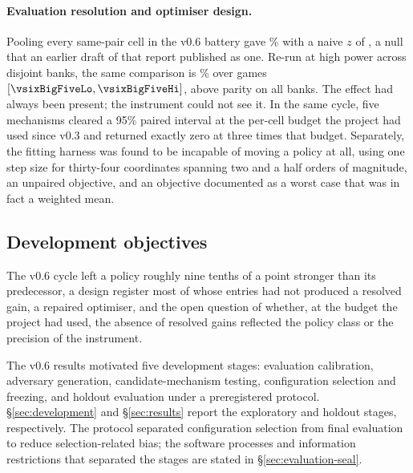 \paragraph{Evaluation resolution and optimiser design.} Pooling every same-pair cell in the v0.6 battery gave \vsixHeadPooled\% with a naive $z$ of
\vsixHeadZ{}, a null that an earlier draft of that report published as one. Re-run at high power
across \vsixBigFiveBanks{} disjoint banks, the same comparison is \vsixBigFive\% over
\vsixBigFiveN{} games $[\vsixBigFiveLo, \vsixBigFiveHi]$, above parity on all \vsixBigFiveAbove{}
banks. The effect had always been present; the instrument could not see it. In the same cycle, five
mechanisms cleared a 95\% paired interval at the per-cell budget the project had used since v0.3 and
returned exactly zero at three times that budget. Separately, the fitting harness was found to be
incapable of moving a policy at all, using one step size for thirty-four coordinates spanning two and
a half orders of magnitude, an unpaired objective, and an objective documented as a worst case that
was in fact a weighted mean.

\subsection{Development objectives}
\label{sec:background-handoff}

The v0.6 cycle left a policy roughly nine tenths of a point stronger than its predecessor, a design
register most of whose entries had not produced a resolved gain, a repaired optimiser, and the open
question of whether, at the budget the project had used, the absence of resolved gains reflected
the policy class or the precision of the instrument.

The v0.6 results motivated five development stages: evaluation calibration, adversary generation,
candidate-mechanism testing, configuration selection and freezing, and holdout evaluation under a
preregistered protocol. \S\ref{sec:development} and \S\ref{sec:results} report the exploratory and
holdout stages, respectively. The protocol separated configuration selection from final evaluation
to reduce selection-related bias; the software processes and information restrictions that separated
the stages are stated in \S\ref{sec:evaluation-seal}.
